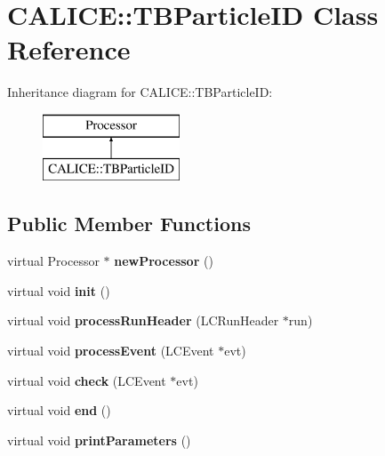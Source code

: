 \section{C\-A\-L\-I\-C\-E\-:\-:T\-B\-Particle\-I\-D Class Reference}
\label{classCALICE_1_1TBParticleID}
Inheritance diagram for C\-A\-L\-I\-C\-E\-:\-:T\-B\-Particle\-I\-D\-:\begin{figure}[H]
\begin{center}
\leavevmode
\includegraphics[height=2.000000cm]{classCALICE_1_1TBParticleID}
\end{center}
\end{figure}
\subsection*{Public Member Functions}
\begin{DoxyCompactItemize}
\item 
virtual Processor $\ast$ {\bfseries new\-Processor} ()\label{classCALICE_1_1TBParticleID_aadfd282af1f27ae3caf7dac62c2fef7d}

\item 
virtual void {\bfseries init} ()\label{classCALICE_1_1TBParticleID_a62119eec9f824b59227306e7ae8d7d8b}

\item 
virtual void {\bfseries process\-Run\-Header} (L\-C\-Run\-Header $\ast$run)\label{classCALICE_1_1TBParticleID_a76978008edc972ed71f12b712a4ede16}

\item 
virtual void {\bfseries process\-Event} (L\-C\-Event $\ast$evt)\label{classCALICE_1_1TBParticleID_a675837ef4e01e67e38333a35e57d8854}

\item 
virtual void {\bfseries check} (L\-C\-Event $\ast$evt)\label{classCALICE_1_1TBParticleID_a9a710d267d75975230465ffc3a4a6570}

\item 
virtual void {\bfseries end} ()\label{classCALICE_1_1TBParticleID_a2f27766b24eb06663e19fda0a12e72bb}

\item 
virtual void {\bfseries print\-Parameters} ()\label{classCALICE_1_1TBParticleID_a04699895d2768c48500e63c6f47ff7a2}

\end{DoxyCompactItemize}
